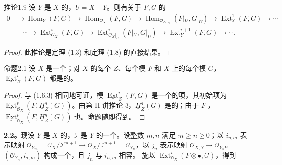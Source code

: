 \begin{SGAresult}{推论}{1.9}
设 $Y$ 是 $X$ 的，$U=X-Y$。则有关于 $F,G$ 的
\[
\begin{aligned}
0&\longrightarrow\operatorname{Hom}_Y(F,G)\longrightarrow\operatorname{Hom}_{\mathscr O_X}(F,G)
\longrightarrow\operatorname{Hom}_{\mathscr O_X|_U}(F|_U,G|_U)\longrightarrow\operatorname{Ext}^1_Y(F,G)\longrightarrow\cdots\\
&\quad\cdots\longrightarrow\operatorname{Ext}^i_{\mathscr O_X}(F,G)
\longrightarrow\operatorname{Ext}^i_{\mathscr O_X|_U}(F|_U,G|_U)
\longrightarrow\operatorname{Ext}^{i+1}_Y(F,G)\longrightarrow\cdots.
\end{aligned}
\]
\end{SGAresult}
\begin{proof}
此推论是定理 (1.3) 和定理 (1.8) 的直接结果。
\end{proof}
\begin{SGAresult}{命题}{2.1}
设 $X$ 是一个；对 $X$ 的每个 $Z$、每个模 $F$ 和 $X$ 上的每个模 $G$，$\underline{\operatorname{Ext}}^i_Z(F,G)$ 都是的。
\end{SGAresult}
\begin{proof}
与 (1.6.3) 相同地可证，模 $\underline{\operatorname{Ext}}^i_Z(F,G)$ 是一个的项，其初始项为 $\underline{\operatorname{Ext}}^p_{\mathscr O_X}(F,\underline H^q_Z(G))$。由第 II 讲推论 3，$\underline H^q_Z(G)$ 是的；由于 $F$ ，$\underline{\operatorname{Ext}}^p_{\mathscr O_X}(F,\underline H^q_Z(G))$ 也。命题随即得到。
\end{proof}
\textbf{2.2。}现设 $Y$ 是 $X$ 的，$\mathscr I$ 是 $Y$ 的一个。设整数 $m,n$ 满足 $m\geq n\geq0$；以 $i_{n,m}$ 表示映射 $\mathscr O_{Y_m}=\mathscr O_X/\mathscr I^{m+1}\to\mathscr O_X/\mathscr I^{n+1}=\mathscr O_{Y_n}$，以 $j_n$ 表示映射 $\mathscr O_{X,Y}\to\mathscr O_{Y_n}$。$(\mathscr O_{Y_n},i_{n,m})$ 构成一个，且 $j_n$ 与 $i_{n,m}$ 相容。
施以 $\operatorname{Ext}^i_{\mathscr O_X}(F\otimes\bullet,G)$，得到
